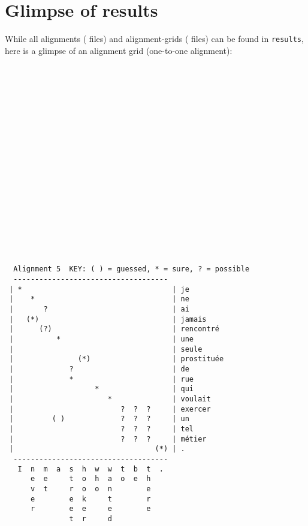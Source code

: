 \documentclass{article}[a4paper]
\begin{document}
\section{Glimpse of results}
While all alignments ( files) and alignment-grids ( files) can be found in \texttt{results}, here is a glimpse of an alignment grid (one-to-one alignment):
\\~\\
\\~\\
\\~\\
\\~\\
\\~\\
\\~\\
\\~\\
\\~\\
\\~\\
\begin{verbatim}
  Alignment 5  KEY: ( ) = guessed, * = sure, ? = possible
  ------------------------------------
 | *                                   | je
 |    *                                | ne
 |       ?                             | ai
 |   (*)                               | jamais
 |      (?)                            | rencontré
 |          *                          | une
 |                                     | seule
 |               (*)                   | prostituée
 |             ?                       | de
 |             *                       | rue
 |                   *                 | qui
 |                      *              | voulait
 |                         ?  ?  ?     | exercer
 |         ( )             ?  ?  ?     | un
 |                         ?  ?  ?     | tel
 |                         ?  ?  ?     | métier
 |                                 (*) | .
  ------------------------------------
   I  n  m  a  s  h  w  w  t  b  t  . 
      e  e     t  o  h  a  o  e  h    
      v  t     r  o  o  n        e    
      e        e  k     t        r    
      r        e  e     e        e    
               t  r     d            
\end{verbatim}



\end{document}
